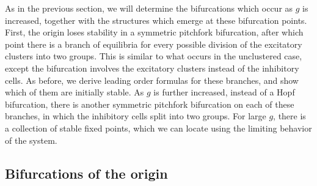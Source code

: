 \documentclass[reqno]{siamonline190516}
\begin{document}
As in the previous section, we will determine the bifurcations which occur as $g$ is increased, together with the structures which emerge at these bifurcation points. First, the origin loses stability in a symmetric pitchfork bifurcation, after which point there is a branch of equilibria for every possible division of the excitatory clusters into two groups. This is similar to what occurs in the unclustered case, except the bifurcation involves the excitatory clusters instead of the inhibitory cells. As before, we derive leading order formulas for these branches, and show which of them are initially stable. As $g$ is further increased, instead of a Hopf bifurcation, there is another symmetric pitchfork bifurcation on each of these branches, in which the inhibitory cells split into two groups. For large $g$, there is a collection of stable fixed points, which we can locate using the limiting behavior of the system.

\subsection{Bifurcations of the origin}\label{sec:Eclusterbiforigin}
\end{document}
